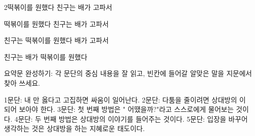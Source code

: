 \documentclass[fs12,seriesSau]{korfarm-base}
\begin{document}
\begin{kfSentenceUnit}{2}{떡볶이를 원했다 친구는 배가 고파서}
\begin{kfChoices}
\kfChoice 떡볶이를
\kfChoice 원했다
\kfChoice 친구는
\kfChoice 배가 고파서
\end{kfChoices}
\begin{kfChoices}
\kfChoice 친구는
\kfChoice 떡볶이를
\kfChoice 원했다
\kfChoice 배가 고파서
\end{kfChoices}
\begin{kfChoices}
\kfChoice 친구는
\kfChoice 배가
\kfChoice 떡볶이를
\kfChoice 원했다
\end{kfChoices}
\end{kfSentenceUnit}

\kfActivityBg {}
\par{}\par\nopagebreak[4]\smallskip\nopagebreak[4]

\kfActivityBg \par{}\par\nopagebreak[4]\smallskip\nopagebreak[4]
\begin{kfBlankList}
\kfBlankItem 요약문 완성하기: 각 문단의 중심 내용을 잘 읽고, 빈칸에 들어갈 알맞은 말을 지문에서 찾아 쓰세요.

1문단: 내 \kfFillBlank[42mm]{}만 옳다고 고집하면 싸움이 일어난다. 2문단: 다툼을 줄이려면 상대방의 \kfFillBlank[42mm]{}이 되어 보아야 한다. 3문단: 첫 번째 방법은 "\kfFillBlank[42mm]{} 어땠을까?"라고 스스로에게 물어보는 것이다. 4문단: 두 번째 방법은 상대방의 이야기를 \kfFillBlank[42mm]{} 들어주는 것이다. 5문단: 입장을 바꾸어 생각하는 것은 상대방을 \kfFillBlank[42mm]{}하는 지혜로운 태도이다.
\end{kfBlankList}

\kfActivityBg \par{}\par\nopagebreak[4]\smallskip\nopagebreak[4]
\end{document}
